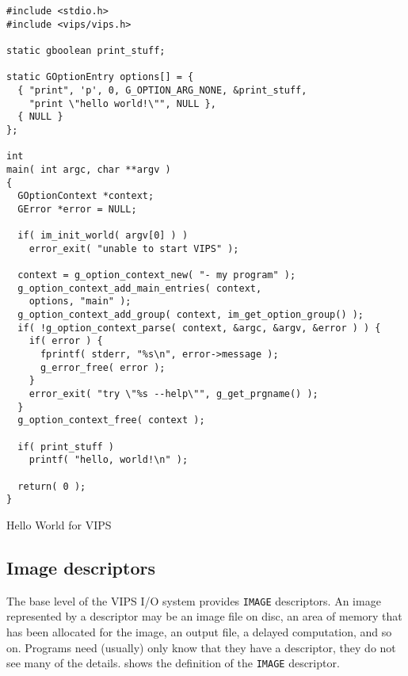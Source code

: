 \begin{fig2}
\begin{verbatim}
#include <stdio.h>
#include <vips/vips.h>

static gboolean print_stuff;

static GOptionEntry options[] = {
  { "print", 'p', 0, G_OPTION_ARG_NONE, &print_stuff,
    "print \"hello world!\"", NULL },
  { NULL }
};

int
main( int argc, char **argv )
{
  GOptionContext *context;
  GError *error = NULL;

  if( im_init_world( argv[0] ) )
    error_exit( "unable to start VIPS" );

  context = g_option_context_new( "- my program" );
  g_option_context_add_main_entries( context,
    options, "main" );
  g_option_context_add_group( context, im_get_option_group() );
  if( !g_option_context_parse( context, &argc, &argv, &error ) ) {
    if( error ) {
      fprintf( stderr, "%s\n", error->message );
      g_error_free( error );
    }
    error_exit( "try \"%s --help\"", g_get_prgname() );
  }
  g_option_context_free( context );

  if( print_stuff )
    printf( "hello, world!\n" );

  return( 0 );
}
\end{verbatim}
\caption{Hello World for VIPS}
\label{fg:hello}
\end{fig2}

\subsection{Image descriptors}

The base level of the VIPS I/O system provides \verb+IMAGE+ descriptors.
An image represented by a descriptor may be an image file on disc, an area
of memory that has been allocated for the image, an output file, a delayed
computation, and so on. Programs need (usually) only know that they have
a descriptor, they do not see many of the details. 
shows the definition of the \verb+IMAGE+ descriptor.

